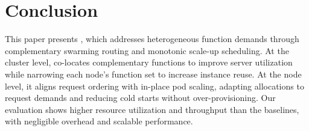 \section{Conclusion}
This paper presents \sysname, which addresses heterogeneous function demands
through complementary swarming routing and monotonic scale-up scheduling. At
the cluster level, \sysname co-locates complementary functions to improve server
utilization while narrowing each node's function set to increase instance reuse.
At the node level, it aligns request ordering with in-place pod scaling, adapting
allocations to request demands and reducing cold starts without over-provisioning.
Our evaluation shows higher resource utilization and throughput than the
baselines, with negligible overhead and scalable performance.
\vspace{-7pt}
